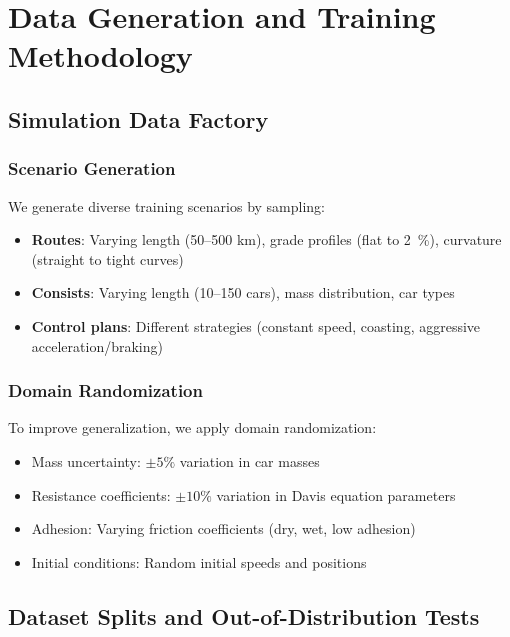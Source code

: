 \chapter{Data Generation and Training Methodology}
\label{ch:training}

\section{Simulation Data Factory}

\subsection{Scenario Generation}

We generate diverse training scenarios by sampling:
\begin{itemize}
    \item \textbf{Routes}: Varying length (50--500 km), grade profiles (flat to \SI{2}{\percent}), curvature (straight to tight curves)
    \item \textbf{Consists}: Varying length (10--150 cars), mass distribution, car types
    \item \textbf{Control plans}: Different strategies (constant speed, coasting, aggressive acceleration/braking)
\end{itemize}


\subsection{Domain Randomization}

To improve generalization, we apply domain randomization:
\begin{itemize}
    \item Mass uncertainty: $\pm 5\%$ variation in car masses
    \item Resistance coefficients: $\pm 10\%$ variation in Davis equation parameters
    \item Adhesion: Varying friction coefficients (dry, wet, low adhesion)
    \item Initial conditions: Random initial speeds and positions
\end{itemize}


\section{Dataset Splits and Out-of-Distribution Tests}

